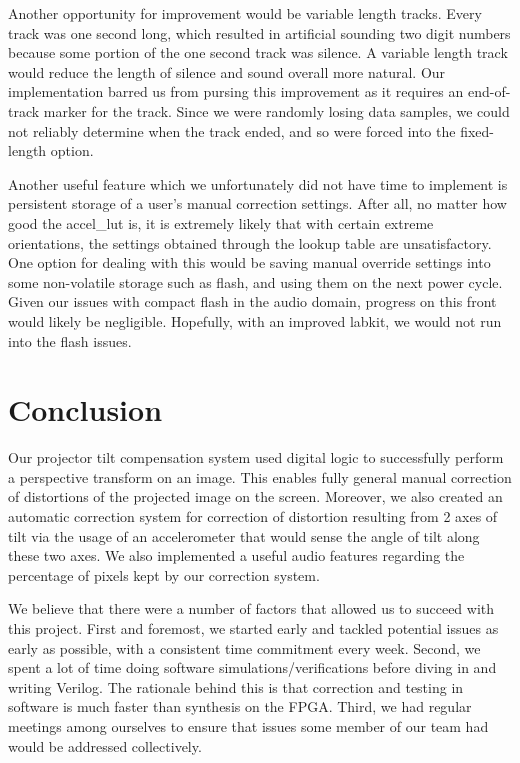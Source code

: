 \documentclass{article}
\begin{document}
Another opportunity for improvement would be variable length tracks. Every track was one second long, which resulted in artificial sounding two digit numbers because some portion of the one second track was silence. A variable length track would reduce the length of silence and sound overall more natural. Our implementation barred us from pursing this improvement as it requires an end-of-track marker for the track. Since we were randomly losing data samples, we could not reliably determine when the track ended, and so were forced into the fixed-length option. 

Another useful feature which we unfortunately did not have time to implement is persistent storage of a user's manual correction settings.
After all, no matter how good the accel\_lut is, it is extremely likely that with certain extreme orientations,
the settings obtained through the lookup table are unsatisfactory.
One option for dealing with this would be saving manual override settings into some non-volatile storage such as flash,
and using them on the next power cycle.
Given our issues with compact flash in the audio domain, progress on this front would likely be negligible.
Hopefully, with an improved labkit, we would not run into the flash issues.

\section{Conclusion}
Our projector tilt compensation system used digital logic to successfully perform a perspective transform on an image.
This enables fully general manual correction of distortions of the projected image on the screen.
Moreover, we also created an automatic correction system for correction of distortion resulting from 2 axes of tilt
via the usage of an accelerometer that would sense the angle of tilt along these two axes.
We also implemented a useful audio features regarding the percentage of pixels kept by our correction system.

We believe that there were a number of factors that allowed us to succeed with this project.
First and foremost, we started early and tackled potential issues as early as possible, with a consistent time commitment every week.
Second, we spent a lot of time doing software simulations/verifications before diving in and writing Verilog.
The rationale behind this is that correction and testing in software is much faster than synthesis on the FPGA.
Third, we had regular meetings among ourselves to ensure that issues some member of our team had would be addressed collectively.
\end{document}
